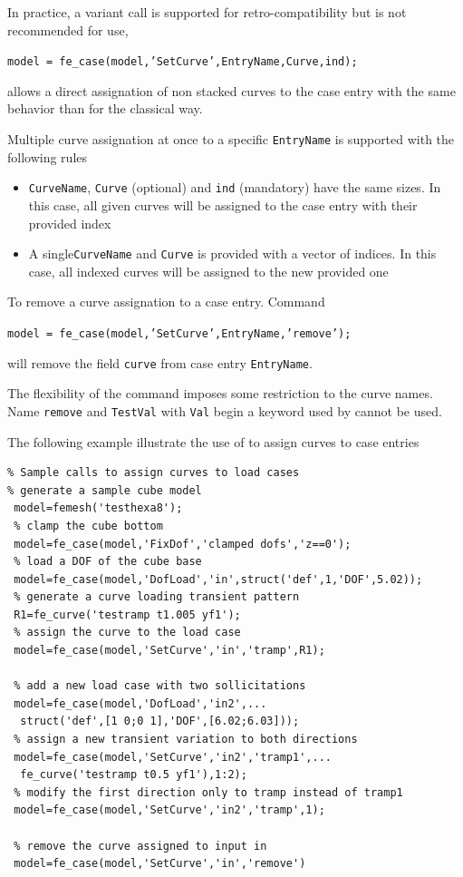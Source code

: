 In practice, a variant call is supported for retro-compatibility but is not recommended for use,

{\tt model = fe\_case(model,'SetCurve',EntryName,Curve,ind);}

allows a direct assignation of non stacked curves to the case entry with the same behavior than for the classical way.

\vs

Multiple curve assignation at once to a specific {\tt EntryName} is supported with the following rules
\begin{itemize}
\item {\tt CurveName}, {\tt Curve} (optional) and {\tt ind} (mandatory) have the same sizes. In this case, all given curves will be assigned to the case entry with their provided index
\item A single{\tt CurveName} and {\tt Curve} is provided with a vector of indices. In this case, all indexed curves will be assigned to the new provided one
\end{itemize}

\vs

To remove a curve assignation to a case entry. Command

{\tt model = fe\_case(model,'SetCurve',EntryName,'remove');}

will remove the field {\tt curve} from case entry {\tt EntryName}.


\vs The flexibility of the command imposes some restriction to the curve names. Name {\tt remove} and {\tt TestVal} with {\tt Val} begin a keyword used by  cannot be used.

\vs

The following example illustrate the use of  to assign curves to case entries

\begin{verbatim}
% Sample calls to assign curves to load cases
% generate a sample cube model
 model=femesh('testhexa8'); 
 % clamp the cube bottom
 model=fe_case(model,'FixDof','clamped dofs','z==0');
 % load a DOF of the cube base
 model=fe_case(model,'DofLoad','in',struct('def',1,'DOF',5.02));
 % generate a curve loading transient pattern
 R1=fe_curve('testramp t1.005 yf1');
 % assign the curve to the load case
 model=fe_case(model,'SetCurve','in','tramp',R1);
 
 % add a new load case with two sollicitations
 model=fe_case(model,'DofLoad','in2',...
  struct('def',[1 0;0 1],'DOF',[6.02;6.03]));
 % assign a new transient variation to both directions
 model=fe_case(model,'SetCurve','in2','tramp1',...
  fe_curve('testramp t0.5 yf1'),1:2);
 % modify the first direction only to tramp instead of tramp1
 model=fe_case(model,'SetCurve','in2','tramp',1);
 
 % remove the curve assigned to input in
 model=fe_case(model,'SetCurve','in','remove')
\end{verbatim}%

